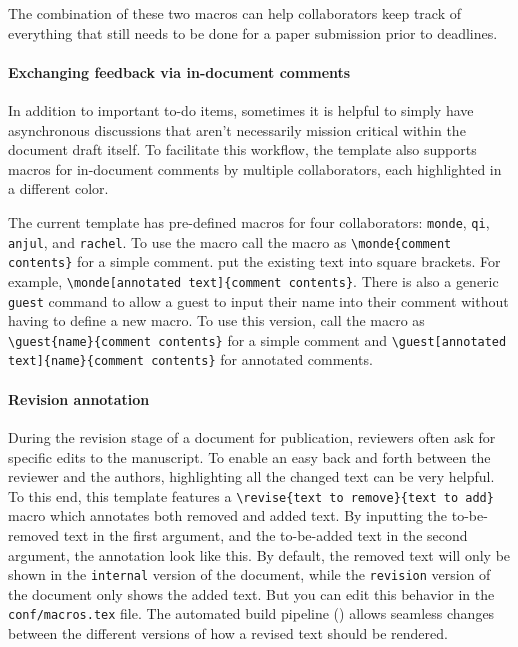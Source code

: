 The combination of these two macros can help collaborators keep track of everything that still needs to be done for a paper submission prior to deadlines.

\paragraph{Exchanging feedback via in-document comments}
In addition to important to-do items, sometimes it is helpful to simply have asynchronous discussions that aren't necessarily mission critical within the document draft itself.
To facilitate this workflow, the template also supports macros for in-document comments by multiple collaborators, each highlighted in a different color.

The current template has pre-defined macros for four collaborators: \texttt{monde}, \texttt{qi}, \texttt{anjul}, and \texttt{rachel}.
To use the macro call the macro as \texttt{\textbackslash monde\{comment contents\}} for a simple comment.
\break
put the existing text into square brackets.
For example, \texttt{\textbackslash monde[anno\hfill\break tated text]\{comment contents\}}.
There is also a generic \texttt{guest} command to allow a guest to input their name into their comment without having to define a new macro.
To use this version, call the macro as \texttt{\textbackslash guest\{name\}\{comment contents\}} for a simple comment and \texttt{\textbackslash guest[annotated text]\{name\}\{comment contents\}} for annotated comments.

\paragraph{Revision annotation}
During the revision stage of a document for publication, reviewers often ask for specific edits to the manuscript.
To enable an easy back and forth between the reviewer and the authors, highlighting all the changed text can be very helpful.
To this end, this template features a \texttt{\textbackslash revise\{text to remove\}\{text to add\}} macro which annotates both removed and added text.
By inputting the to-be-removed text in the first argument, and the to-be-added text in the second argument, the annotation  look like this.
By default, the removed text will only be shown in the \texttt{internal} version of the document, while the \texttt{revision} version of the document only shows the added text.
But you can edit this behavior in the \texttt{conf/macros.tex} file.
The automated build pipeline (\cf {}) allows seamless changes between the different versions of how a revised text should be rendered.


